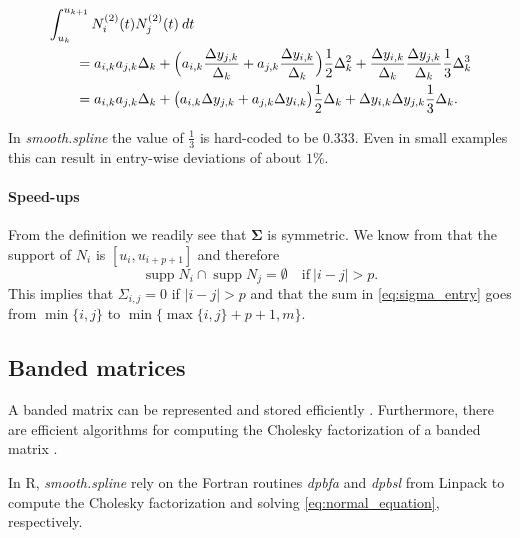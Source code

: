 \documentclass[a4paper]{scrartcl}
\newcommand{\mat}[1]{\ensuremath{\bm{#1}}}
\newcommand\dd{\ensuremath{\:d}}
\DeclareMathOperator\supp{supp}
\begin{document}
\begin{align*}
    \MoveEqLeft
    \int_{u_k}^{u_{k+1}} N_i^{(2)}(t) N_j^{(2)}(t) \dd t 
    \\
    & = a_{i,k} a_{j,k} \Delta_k + \Bigl(a_{i,k} \frac{\Delta y_{j,k}}{\Delta_k} + a_{j,k} \frac{\Delta y_{i,k}}{\Delta_k}\Bigr) \frac12 \Delta_k^2 + \frac{\Delta y_{i,k}}{\Delta_k} \frac{\Delta y_{j,k}}{\Delta_k} \frac13 \Delta_k^3
    \\
    & = a_{i,k} a_{j,k} \Delta_k + \bigl(a_{i,k} \Delta y_{j,k} + a_{j,k} \Delta y_{i,k}\bigr) \frac12 \Delta_k + \Delta y_{i,k} \Delta y_{j,k} \frac13 \Delta_k.
\end{align*}

In \textit{smooth.spline} the value of $\tfrac13$ is hard-coded to be $0.333$.
Even in small examples this can result in entry-wise deviations of about $1\%$.


\paragraph{Speed-ups}

From the definition we readily see that $\mat\Sigma$ is symmetric.
We know from \cite[P2.1]{Piegl:Tiller:1997} that the support of $N_i$ is $[u_i, u_{i+p+1}]$ and therefore 
\begin{equation*}
    \supp N_i \cap \supp N_j = \emptyset
    \quad\text{if}\:
    |i - j| > p.
\end{equation*}
This implies that $\Sigma_{i,j} = 0$ if $|i - j| > p$ and that the sum in \cref{eq:sigma_entry} goes from $\min\{i, j\}$ to $\min\{\max\{i, j\} + p + 1, m\}$.


\subsection{Banded matrices}

A banded matrix can be represented and stored efficiently \cite[Section 1.2.5]{Golub:van_Loan:2013}.
Furthermore, there are efficient algorithms for computing the Cholesky factorization of a banded matrix \cite[Section 4.3]{Golub:van_Loan:2013}.

In R, \textit{smooth.spline} rely on the Fortran routines \textit{dpbfa} and \textit{dpbsl} from Linpack \cite{Dongarra:Moler:Bunch:Stewart:1979} to compute the Cholesky factorization and solving \cref{eq:normal_equation}, respectively.


\printbibliography
\end{document}
